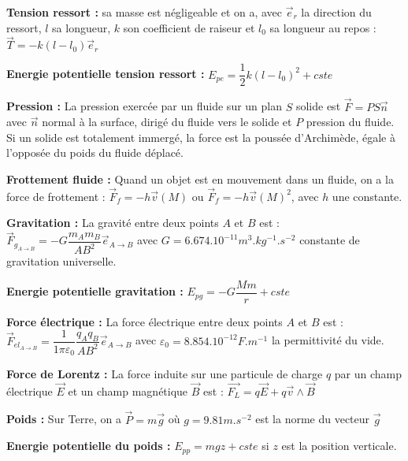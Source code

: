 \documentclass[a4paper,12pt]{book}
\newcommand{\Thr}[2]{\begin{tcolorbox}[sharp corners, colback=white,colframe=red!10!blue!30!green!75!, title=Théorème : #1]#2\end{tcolorbox}}
\begin{document}
\Thr{Modélisation des forces usuelles}{\textbf{Tension ressort :} sa masse est négligeable et on a, avec $\vec{e}_r$ la direction du ressort, $l$ sa longueur, $k$ son coefficient de raiseur et $l_0$ sa longueur au repos : $\vec{T} = -k(l-l_0)\vec{e}_r$
\par\textbf{Energie potentielle tension ressort :} $E_{pe}= \dfrac{1}{2}k(l-l_0)^2+cste$
\par\textbf{Pression :} La pression exercée par un fluide sur un plan $S$ solide est $\vec{F} = PS\vec{n}$ avec $\vec{n}$ normal à la surface, dirigé du fluide vers le solide et $P$ pression du fluide. Si un solide est totalement immergé, la force est la poussée d'Archimède, égale à l'opposée du poids du fluide déplacé.
\par\textbf{Frottement fluide :} Quand un objet est en mouvement dans un fluide, on a la force de frottement : $\vec{F}_f = -h\vec{v}(M)$ ou $\vec{F}_f = -h\vec{v}(M)^2$, avec $h$ une constante.
\par\textbf{Gravitation :} La gravité entre deux points $A$ et $B$ est : $\vec{F}_{g_{A\to B}} = -G\dfrac{m_Am_B}{AB^2}\vec{e}_{A\to B}$ avec $G=6.674.10^{-11} m^3.kg^{-1}.s^{-2}$ constante de gravitation universelle.
\par\textbf{Energie potentielle gravitation :} $E_{pg} = -G\dfrac{Mm}{r}+cste$ 
\par\textbf{Force électrique :} La force électrique entre deux points $A$ et $B$ est : $\vec{F}_{el_{A\to B}} = \dfrac{1}{1\pi\varepsilon_0}\dfrac{q_Aq_B}{AB^2}\vec{e}_{A\to B}$ avec $\varepsilon_0 = 8.854.10^{-12} F.m^{-1}$ la permittivité du vide.
\par\textbf{Force de Lorentz :} La force induite sur une particule de charge $q$ par un champ électrique $\vec{E}$ et un champ magnétique $\vec{B}$ est : $\overrightarrow{F_L} = q\vec{E} + q\vec{v}\wedge \vec{B}$ 
\par\textbf{Poids :} Sur Terre, on a $\vec{P} = m\vec{g}$ où $g=9.81 m.s^{-2}$ est la norme du vecteur $\vec{g}$
\par\textbf{Energie potentielle du poids :} $E_{pp} = mgz+cste$ si $z$ est la position verticale.}
\end{document}

